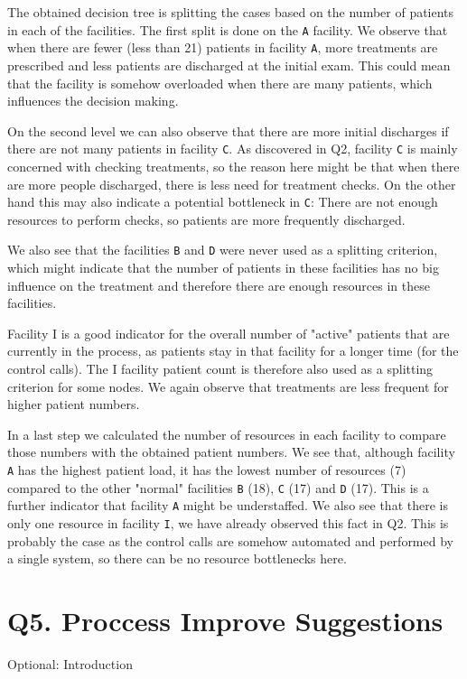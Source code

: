 \documentclass[12pt]{report}
\begin{document}
The obtained decision tree is splitting the cases based on the number of patients in each of the facilities. The first split is done on the \texttt{A} facility. We observe that when there are fewer (less than 21) patients in facility \texttt{A}, more treatments are prescribed and less patients are discharged at the initial exam. This could mean that the facility is somehow overloaded when there are many patients, which influences the decision making. 

On the second level we can also observe that there are more initial discharges if there are not many patients in facility \texttt{C}. As discovered in Q2, facility \texttt{C} is mainly concerned with checking treatments, so the reason here might be that when there are more people discharged, there is less need for treatment checks. On the other hand this may also indicate a potential bottleneck in \texttt{C}: There are not enough resources to perform checks, so patients are more frequently discharged.

We also see that the facilities \texttt{B} and \texttt{D} were never used as a splitting criterion, which might indicate that the number of patients in these facilities has no big influence on the treatment and therefore there are enough resources in these facilities.

Facility I is a good indicator for the overall number of "active" patients that are currently in the process, as patients stay in that facility for a longer time (for the control calls). The I facility patient count is therefore also used as a splitting criterion for some nodes. We again observe that treatments are less frequent for higher patient numbers.

In a last step we calculated the number of resources in each facility to compare those numbers with the obtained patient numbers. We see that, although facility \texttt{A} has the highest patient load, it has the lowest number of resources (7) compared to the other "normal" facilities \texttt{B} (18), \texttt{C} (17) and \texttt{D} (17). This is a further indicator that facility \texttt{A} might be understaffed. We also see that there is only one resource in facility \texttt{I}, we have already observed this fact in Q2. This is probably the case as the control calls are somehow automated and performed by a single system, so there can be no resource bottlenecks here.

\section{Q5. Proccess Improve Suggestions}
\textlangle Optional: Introduction \textrangle \\
\end{document}
